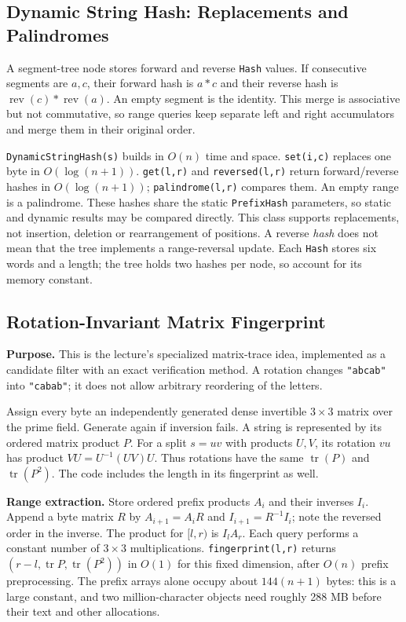 \subsection{Dynamic String Hash: Replacements and Palindromes}
A segment-tree node stores forward and reverse \texttt{Hash} values.
If consecutive segments are $a,c$, their forward hash is $a*c$ and
their reverse hash is $\operatorname{rev}(c)*\operatorname{rev}(a)$.
An empty segment is the identity. This merge is associative but not
commutative, so range queries keep separate left and right accumulators
and merge them in their original order.

\texttt{DynamicStringHash(s)} builds in $O(n)$ time and space.
\texttt{set(i,c)} replaces one byte in $O(\log(n+1))$.
\texttt{get(l,r)} and \texttt{reversed(l,r)} return forward/reverse
hashes in $O(\log(n+1))$; \texttt{palindrome(l,r)} compares them.
An empty range is a palindrome. These hashes share the static
\texttt{PrefixHash} parameters, so static and dynamic results may be
compared directly. This class supports replacements, not insertion,
deletion or rearrangement of positions. A reverse \emph{hash} does
not mean that the tree implements a range-reversal update.
Each \texttt{Hash} stores six words and a length; the tree holds two
hashes per node, so account for its memory constant.


\subsection{Rotation-Invariant Matrix Fingerprint}
\textbf{Purpose.} This is the lecture's specialized matrix-trace idea,
implemented as a candidate filter with an exact verification method.
A rotation changes \texttt{"abcab"} into \texttt{"cabab"}; it does
not allow arbitrary reordering of the letters.

Assign every byte an independently generated dense invertible
$3\times3$ matrix over the prime field. Generate again if inversion
fails. A string is represented by its ordered matrix product $P$.
For a split $s=uv$ with products $U,V$, its rotation $vu$ has product
$VU=U^{-1}(UV)U$. Thus rotations have the same
$\operatorname{tr}(P)$ and $\operatorname{tr}(P^2)$.
The code includes the length in its fingerprint as well.

\textbf{Range extraction.} Store ordered prefix products $A_i$ and
their inverses $I_i$. Append a byte matrix $R$ by
$A_{i+1}=A_iR$ and $I_{i+1}=R^{-1}I_i$; note the reversed order
in the inverse. The product for $[l,r)$ is $I_lA_r$.
Each query performs a constant number of $3\times3$ multiplications.
\texttt{fingerprint(l,r)} returns
$(r-l,\operatorname{tr}P,\operatorname{tr}(P^2))$ in $O(1)$ for
this fixed dimension, after $O(n)$ prefix preprocessing.
The prefix arrays alone occupy about $144(n+1)$ bytes: this is a
large constant, and two million-character objects need roughly
288 MB before their text and other allocations.


